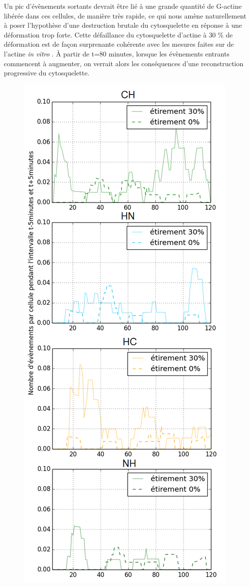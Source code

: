 Un pic d'évènements sortants devrait être lié à une grande quantité de G-actine libérée dans ces cellules, de manière très rapide, ce qui nous amène naturellement à poser l'hypothèse d'une destruction brutale du cytosquelette en réponse à une déformation trop forte. Cette défaillance du cytosquelette d'actine à 30 \% de déformation est de façon surprenante cohérente avec les mesures faites sur de l'actine \textit{in vitro} \cite{janmey_mechanical_1994}. 
À partir de t=80 minutes, lorsque les évènements entrants commencent à augmenter, on verrait alors les conséquences d'une reconstruction progressive du cytosquelette. 

 
\begin{figure}
\includegraphics[scale=0.4]{Figures/Etirement30_vs_0_translocations.png}

\end{figure}
